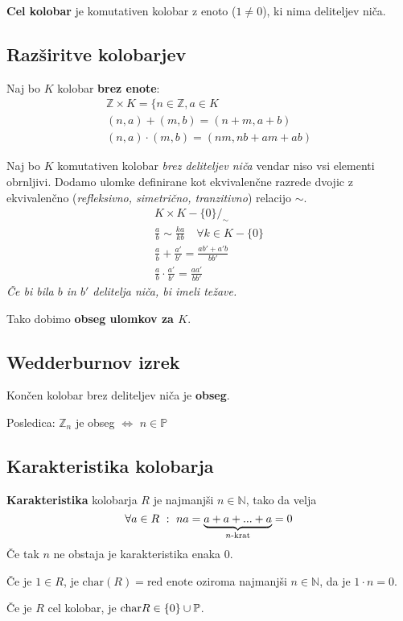 	\textbf{Cel kolobar} je komutativen kolobar z enoto ($1\neq0$), ki nima deliteljev niča.

	\subsection*{Razširitve kolobarjev}
	Naj bo $K$ kolobar \textbf{brez enote}:
	\begin{gather*}
		\mathbb{Z} \times K = \{ n \in \mathbb{Z}, a \in K \\
		(n,a) + (m,b) = (n+m, a+b) \\
		(n,a) \cdot (m,b) = (nm, nb+am+ab)
	\end{gather*}

	Naj bo $K$ komutativen kolobar \emph{brez deliteljev niča} vendar niso vsi elementi obrnljivi. Dodamo ulomke definirane kot ekvivalenčne razrede dvojic z ekvivalenčno (\emph{refleksivno, simetrično, tranzitivno}) relacijo $\sim$.
	\begin{gather*}
		K \times K-\{0\} \Big/_\sim\\
		\frac{a}{b} \sim \frac{ka}{kb} \quad \forall k \in K-\{0\} \\
		\frac{a}{b} + \frac{a'}{b'} = \frac{ab' + a'b}{bb'}\\
		\frac{a}{b} \cdot \frac{a'}{b'} = \frac{aa'}{bb'}
	\end{gather*}
	\emph{Če bi bila $b$ in $b'$ delitelja niča, bi imeli težave.}

	Tako dobimo \textbf{obseg ulomkov za $K$}.

	\subsection*{Wedderburnov izrek}
	Končen kolobar brez deliteljev niča je \textbf{obseg}.

	Posledica:
	$\mathbb{Z}_n$ je obseg $\iff$ $n\in\mathbb{P}$

	\subsection*{Karakteristika kolobarja}
	\textbf{Karakteristika} kolobarja $R$ je najmanjši $n\in \mathbb{N}$, tako da velja 
	\[\forall a \in R\ :\ na = \underbrace{a+a+...+a}_{n\textmd{-krat}} = 0\]
	Če tak $n$ ne obstaja je karakteristika enaka $0$.

	Če je $1 \in R$, je $\text{char}(R) = \text{red enote}$ oziroma najmanjši $n \in \mathbb{N}$, da je $1\cdot n = 0$. 

	Če je $R$ cel kolobar, je $\textmd{char}R \in \{0\} \cup \mathbb{P}$.

